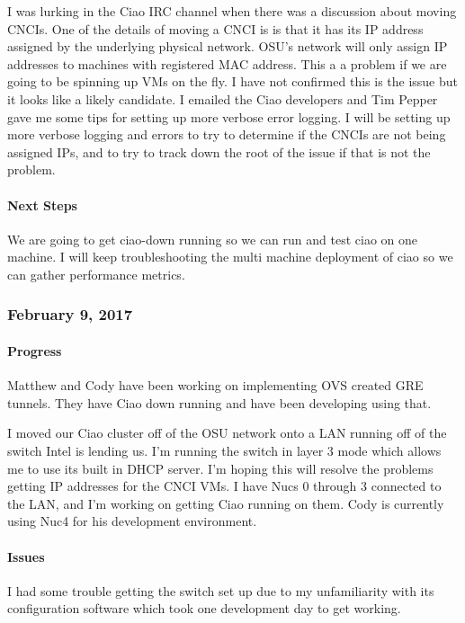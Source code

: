 \documentclass[10pt,onecolumn,journal,draftclsnofoot]{IEEEtran}
\begin{document}
I was lurking in the Ciao IRC channel when there was a discussion about
moving CNCIs. One of the details of moving a CNCI is is that it has its
IP address assigned by the underlying physical network. OSU's network
will only assign IP addresses to machines with registered MAC address.
This a a problem if we are going to be spinning up VMs on the fly. I
have not confirmed this is the issue but it looks like a likely
candidate. I emailed the Ciao developers and Tim Pepper gave me some
tips for setting up more verbose error logging. I will be setting up
more verbose logging and errors to try to determine if the CNCIs are not
being assigned IPs, and to try to track down the root of the issue if
that is not the problem.

\paragraph{Next Steps} 

We are going to get ciao-down running so we can run and test ciao on one
machine. I will keep troubleshooting the multi machine deployment of
ciao so we can gather performance metrics.

\subsubsection{February 9, 2017} 

\paragraph{Progress} 

Matthew and Cody have been working on implementing OVS created GRE
tunnels. They have Ciao down running and have been developing using
that.

I moved our Ciao cluster off of the OSU network onto a LAN running off
of the switch Intel is lending us. I'm running the switch in layer 3
mode which allows me to use its built in DHCP server. I'm hoping this
will resolve the problems getting IP addresses for the CNCI VMs. I have
Nucs 0 through 3 connected to the LAN, and I'm working on getting Ciao
running on them. Cody is currently using Nuc4 for his development
environment.

\paragraph{Issues} 

I had some trouble getting the switch set up due to my unfamiliarity
with its configuration software which took one development day to get
working.
\end{document}

